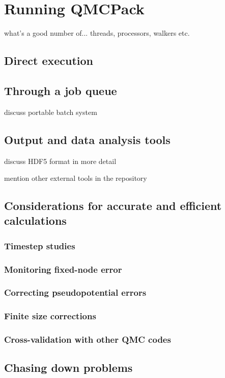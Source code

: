 \chapter{Running QMCPack}
what's a good number of... threads, processors, walkers etc.
\section{Direct execution}
\section{Through a job queue}
discuss portable batch system
\section{Output and data analysis tools}
discuss HDF5 format in more detail

mention other external tools in the repository
\section{Considerations for accurate and efficient calculations}
\subsection{Timestep studies}
\subsection{Monitoring fixed-node error}
\subsection{Correcting pseudopotential errors}
\subsection{Finite size corrections}
\subsection{Cross-validation with other QMC codes}
\section{Chasing down problems}


